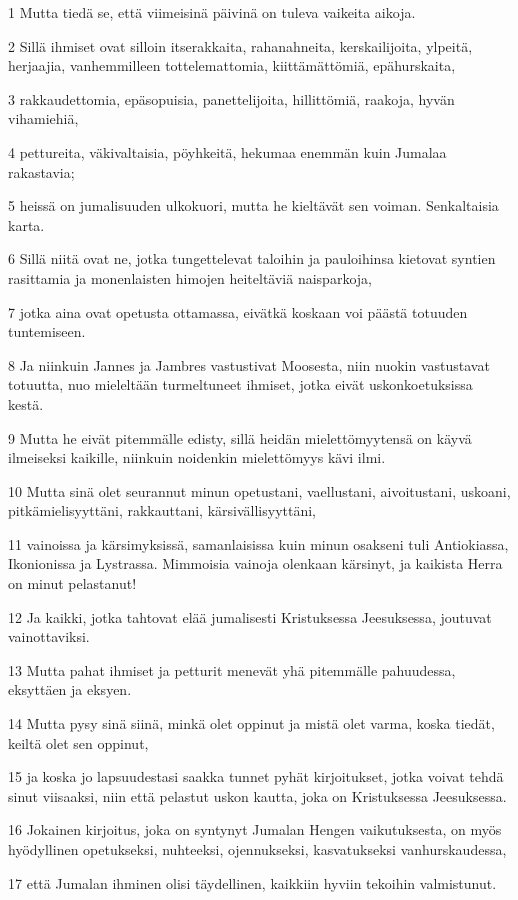 \par 1 Mutta tiedä se, että viimeisinä päivinä on tuleva vaikeita aikoja.
\par 2 Sillä ihmiset ovat silloin itserakkaita, rahanahneita, kerskailijoita, ylpeitä, herjaajia, vanhemmilleen tottelemattomia, kiittämättömiä, epähurskaita,
\par 3 rakkaudettomia, epäsopuisia, panettelijoita, hillittömiä, raakoja, hyvän vihamiehiä,
\par 4 pettureita, väkivaltaisia, pöyhkeitä, hekumaa enemmän kuin Jumalaa rakastavia;
\par 5 heissä on jumalisuuden ulkokuori, mutta he kieltävät sen voiman. Senkaltaisia karta.
\par 6 Sillä niitä ovat ne, jotka tungettelevat taloihin ja pauloihinsa kietovat syntien rasittamia ja monenlaisten himojen heiteltäviä naisparkoja,
\par 7 jotka aina ovat opetusta ottamassa, eivätkä koskaan voi päästä totuuden tuntemiseen.
\par 8 Ja niinkuin Jannes ja Jambres vastustivat Moosesta, niin nuokin vastustavat totuutta, nuo mieleltään turmeltuneet ihmiset, jotka eivät uskonkoetuksissa kestä.
\par 9 Mutta he eivät pitemmälle edisty, sillä heidän mielettömyytensä on käyvä ilmeiseksi kaikille, niinkuin noidenkin mielettömyys kävi ilmi.
\par 10 Mutta sinä olet seurannut minun opetustani, vaellustani, aivoitustani, uskoani, pitkämielisyyttäni, rakkauttani, kärsivällisyyttäni,
\par 11 vainoissa ja kärsimyksissä, samanlaisissa kuin minun osakseni tuli Antiokiassa, Ikonionissa ja Lystrassa. Mimmoisia vainoja olenkaan kärsinyt, ja kaikista Herra on minut pelastanut!
\par 12 Ja kaikki, jotka tahtovat elää jumalisesti Kristuksessa Jeesuksessa, joutuvat vainottaviksi.
\par 13 Mutta pahat ihmiset ja petturit menevät yhä pitemmälle pahuudessa, eksyttäen ja eksyen.
\par 14 Mutta pysy sinä siinä, minkä olet oppinut ja mistä olet varma, koska tiedät, keiltä olet sen oppinut,
\par 15 ja koska jo lapsuudestasi saakka tunnet pyhät kirjoitukset, jotka voivat tehdä sinut viisaaksi, niin että pelastut uskon kautta, joka on Kristuksessa Jeesuksessa.
\par 16 Jokainen kirjoitus, joka on syntynyt Jumalan Hengen vaikutuksesta, on myös hyödyllinen opetukseksi, nuhteeksi, ojennukseksi, kasvatukseksi vanhurskaudessa,
\par 17 että Jumalan ihminen olisi täydellinen, kaikkiin hyviin tekoihin valmistunut.


